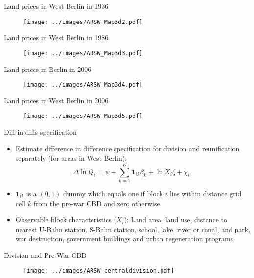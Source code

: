 \documentclass[10pt,notes=hide]{beamer}
\begin{document}
\begin{frame}{Land prices in West Berlin in 1936}
\begin{figure}
\centering
  \texttt{[image: ../images/ARSW\_Map3d2.pdf]}
\end{figure}
\end{frame}
\begin{frame}{Land prices in West Berlin in 1986}
\begin{figure}
\centering
  \texttt{[image: ../images/ARSW\_Map3d3.pdf]}
\end{figure}
\end{frame}
\begin{frame}{Land prices in Berlin in 2006}
\begin{figure}
\centering
  \texttt{[image: ../images/ARSW\_Map3d4.pdf]}
\end{figure}
\end{frame}
\begin{frame}{Land prices in West Berlin in 2006}
\begin{figure}
\centering
  \texttt{[image: ../images/ARSW\_Map3d5.pdf]}
\end{figure}
\end{frame}
\begin{frame}{Diff-in-diffs specification}
\begin{itemize}
\item Estimate difference in difference specification for division and reunification separately (for areas in West Berlin):
\begin{equation*}
\Delta \ln Q_{i} = \psi + \sum_{k=1}^{K} \mathbf{1}_{ik} \beta_{k} + \ln X_{i} \zeta + \chi_{i},\label{emprent3}
\end{equation*}
\item $\mathbf{1}_{ik}$ is a $(0,1)$ dummy which equals one if block $i$ lies within distance grid cell $k$ from the pre-war CBD and zero otherwise
\item Observable block characteristics ($X_{i}$): Land area, land use, distance to nearest U-Bahn station, S-Bahn station, school, lake, river or canal, and park, war destruction, government buildings and urban regeneration programs
\end{itemize}
\end{frame}
\begin{frame}{Division and Pre-War CBD}
\begin{figure}
\centering
  \texttt{[image: ../images/ARSW\_centraldivision.pdf]}
\end{figure}
\end{frame}
\end{document}
